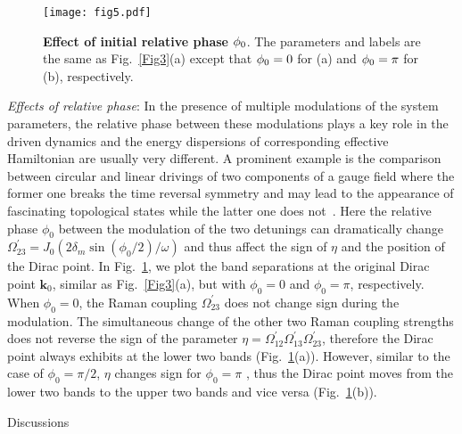 \documentclass[aps,prl,twocolumn,floatfix,reprint]{revtex4}
\begin{document}
\begin{figure}[b]
\centerline{
\texttt{[image: fig5.pdf]}} %
\caption{\textbf{Effect of initial relative phase }$\protect\phi _{0}$. The
parameters and labels are the same as Fig.~\protect\ref{Fig3}(a) except that
$\protect\phi _{0}=0$ for (a) and $\protect\phi _{0}=\protect\pi $ for (b),
respectively.}
\label{fig:phase}
\end{figure}

\emph{Effects of relative phase}: In the presence of multiple modulations of
the system parameters, the relative phase between these modulations plays a
key role in the driven dynamics and the energy dispersions of corresponding
effective Hamiltonian are usually very different. A prominent example is the
comparison between circular and linear drivings of two components of a gauge
field where the former one breaks the time reversal symmetry and may lead to
the appearance of fascinating topological states while the latter one does
not~\cite{Wang2013, Jotzu2014}. Here the relative phase $\phi _{0}$ between
the modulation of the two detunings can dramatically change $\Omega
_{23}^{\prime }=J_{0}\left( 2\delta _{m}\sin (\phi _{0}/2)/\omega \right) $
and thus affect the sign of $\eta $ and the position of the Dirac point. In
Fig.~\ref{fig:phase}, we plot the band separations at the original Dirac
point $\mathbf{k}_{0}$, similar as Fig.~\ref{Fig3}(a), but with $\phi _{0}=0$
and $\phi _{0}=\pi $, respectively. When $\phi _{0}=0$, the Raman coupling $%
\Omega _{23}^{\prime }$ does not change sign during the modulation. The
simultaneous change of the other two Raman coupling strengths does not
reverse the sign of the parameter $\eta =\Omega _{12}^{\prime }\Omega
_{13}^{\prime }\Omega _{23}^{\prime }$, therefore the Dirac point always
exhibits at the lower two bands (Fig.~\ref{fig:phase}(a)). However, similar
to the case of $\phi _{0}=\pi /2$, $\eta $ changes sign for $\phi _{0}=\pi $%
, thus the Dirac point moves from the lower two bands to the upper two bands
and vice versa (Fig.~\ref{fig:phase}(b)).

{\Large Discussions}
\end{document}
